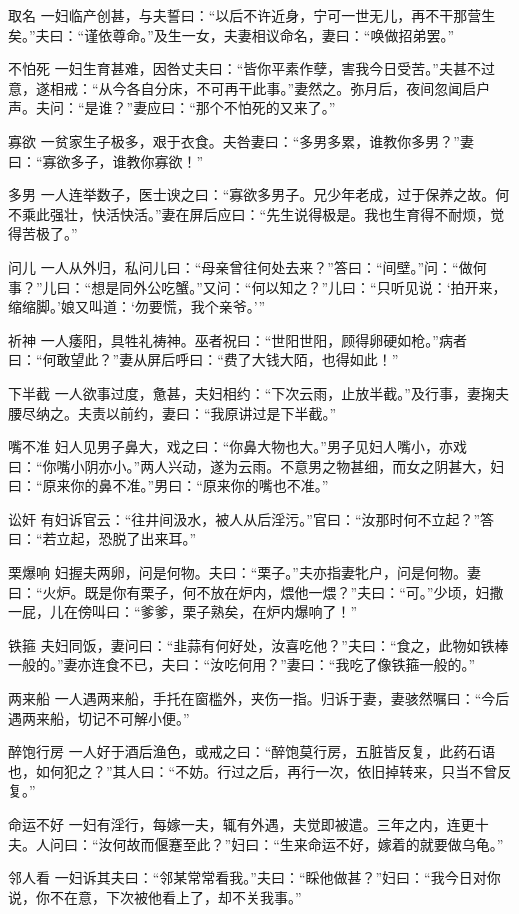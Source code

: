\documentclass[12pt,UTF8]{ctexbook}
\begin{document}
取名
一妇临产创甚，与夫誓曰：“以后不许近身，宁可一世无儿，再不干那营生矣。”夫曰：“谨依尊命。”及生一女，夫妻相议命名，妻曰：“唤做招弟罢。”

不怕死
一妇生育甚难，因咎丈夫曰：“皆你平素作孽，害我今日受苦。”夫甚不过意，遂相戒：“从今各自分床，不可再干此事。”妻然之。弥月后，夜间忽闻启户声。夫问：“是谁？”妻应曰：“那个不怕死的又来了。”

寡欲
一贫家生子极多，艰于衣食。夫咎妻曰：“多男多累，谁教你多男？”妻曰：“寡欲多子，谁教你寡欲！”

多男
一人连举数子，医士谀之曰：“寡欲多男子。兄少年老成，过于保养之故。何不乘此强壮，快活快活。”妻在屏后应曰：“先生说得极是。我也生育得不耐烦，觉得苦极了。”

问儿
一人从外归，私问儿曰：“母亲曾往何处去来？”答曰：“间壁。”问：“做何事？”儿曰：“想是同外公吃蟹。”又问：“何以知之？”儿曰：“只听见说：‘拍开来，缩缩脚。’娘又叫道：‘勿要慌，我个亲爷。’”

祈神
一人痿阳，具牲礼祷神。巫者祝曰：“世阳世阳，顾得卵硬如枪。”病者曰：“何敢望此？”妻从屏后呼曰：“费了大钱大陌，也得如此！”

下半截
一人欲事过度，惫甚，夫妇相约：“下次云雨，止放半截。”及行事，妻掬夫腰尽纳之。夫责以前约，妻曰：“我原讲过是下半截。”

嘴不准
妇人见男子鼻大，戏之曰：“你鼻大物也大。”男子见妇人嘴小，亦戏曰：“你嘴小阴亦小。”两人兴动，遂为云雨。不意男之物甚细，而女之阴甚大，妇曰：“原来你的鼻不准。”男曰：“原来你的嘴也不准。”

讼奸
有妇诉官云：“往井间汲水，被人从后淫污。”官曰：“汝那时何不立起？”答曰：“若立起，恐脱了出来耳。”

栗爆响
妇握夫两卵，问是何物。夫曰：“栗子。”夫亦指妻牝户，问是何物。妻曰：“火炉。既是你有栗子，何不放在炉内，煨他一煨？”夫曰：“可。”少顷，妇撒一屁，儿在傍叫曰：“爹爹，栗子熟矣，在炉内爆响了！”

铁箍
夫妇同饭，妻问曰：“韭蒜有何好处，汝喜吃他？”夫曰：“食之，此物如铁棒一般的。”妻亦连食不已，夫曰：“汝吃何用？”妻曰：“我吃了像铁箍一般的。”

两来船
一人遇两来船，手托在窗槛外，夹伤一指。归诉于妻，妻骇然嘱曰：“今后遇两来船，切记不可解小便。”

醉饱行房
一人好于酒后渔色，或戒之曰：“醉饱莫行房，五脏皆反复，此药石语也，如何犯之？”其人曰：“不妨。行过之后，再行一次，依旧掉转来，只当不曾反复。”

命运不好
一妇有淫行，每嫁一夫，辄有外遇，夫觉即被遣。三年之内，连更十夫。人问曰：“汝何故而偃蹇至此？”妇曰：“生来命运不好，嫁着的就要做乌龟。”

邻人看
一妇诉其夫曰：“邻某常常看我。”夫曰：“睬他做甚？”妇曰：“我今日对你说，你不在意，下次被他看上了，却不关我事。”
\end{document}
